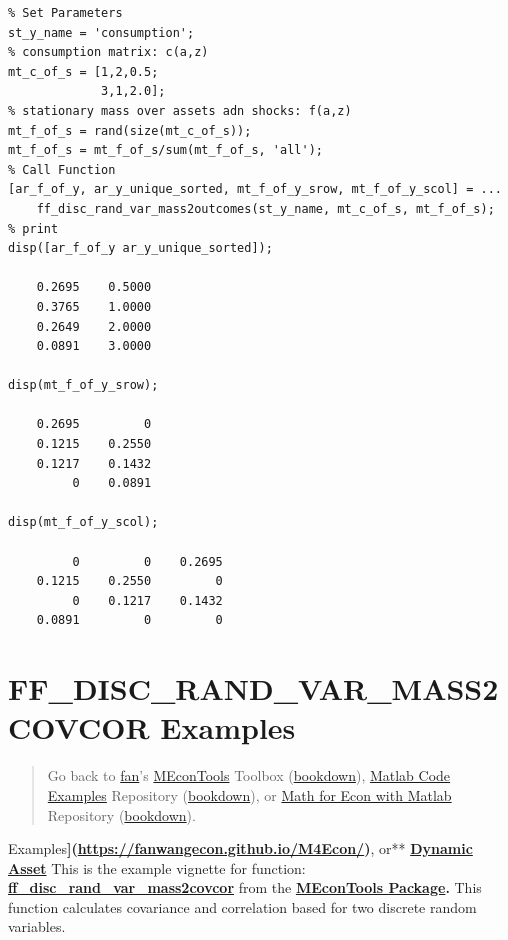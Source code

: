 \documentclass[
]{book}
\begin{document}
\begin{verbatim}
% Set Parameters
st_y_name = 'consumption';
% consumption matrix: c(a,z)
mt_c_of_s = [1,2,0.5;
             3,1,2.0];
% stationary mass over assets adn shocks: f(a,z)
mt_f_of_s = rand(size(mt_c_of_s));
mt_f_of_s = mt_f_of_s/sum(mt_f_of_s, 'all');
% Call Function
[ar_f_of_y, ar_y_unique_sorted, mt_f_of_y_srow, mt_f_of_y_scol] = ...
    ff_disc_rand_var_mass2outcomes(st_y_name, mt_c_of_s, mt_f_of_s);
% print
disp([ar_f_of_y ar_y_unique_sorted]);

    0.2695    0.5000
    0.3765    1.0000
    0.2649    2.0000
    0.0891    3.0000

disp(mt_f_of_y_srow);

    0.2695         0
    0.1215    0.2550
    0.1217    0.1432
         0    0.0891

disp(mt_f_of_y_scol);

         0         0    0.2695
    0.1215    0.2550         0
         0    0.1217    0.1432
    0.0891         0         0
\end{verbatim}

\hypertarget{ff_disc_rand_var_mass2covcor-examples}{%
\section{FF\_DISC\_RAND\_VAR\_MASS2COVCOR Examples}\label{ff_disc_rand_var_mass2covcor-examples}}

\begin{quote}
Go back to \href{http://fanwangecon.github.io/}{fan}'s \href{https://fanwangecon.github.io/MEconTools/}{MEconTools} Toolbox (\href{https://fanwangecon.github.io/MEconTools/bookdown}{bookdown}), \href{https://fanwangecon.github.io/M4Econ/}{Matlab Code Examples} Repository (\href{https://fanwangecon.github.io/M4Econ/bookdown}{bookdown}), or \href{https://fanwangecon.github.io/Math4Econ/}{Math for Econ with Matlab} Repository (\href{https://fanwangecon.github.io/Math4Econ/bookdown}{bookdown}).
\end{quote}

Examples\textbf{{]}(\url{https://fanwangecon.github.io/M4Econ/})}, or** \href{https://fanwangecon.github.io/CodeDynaAsset/}{\textbf{Dynamic
Asset}}
This is the example vignette for function:
\href{https://github.com/FanWangEcon/MEconTools/blob/master/MEconTools/stats/ff_disc_rand_var_mass2covcor.m}{\textbf{ff\_disc\_rand\_var\_mass2covcor}}
from the \href{https://fanwangecon.github.io/MEconTools/}{\textbf{MEconTools
Package}}\textbf{.} This function
calculates covariance and correlation based for two discrete random
variables.
\end{document}
